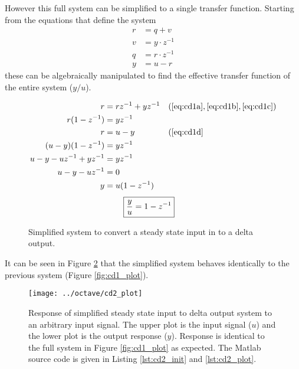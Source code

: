 \documentclass{article}
\begin{document}
\begin{samepage}
However this full system can be simplified to a single transfer function.
Starting from the equations that define the system
\begin{align}
	r &= q + v \label{eq:cd1a} \\
	v &= y \cdot z^{-1} \label{eq:cd1b} \\
	q &= r \cdot z^{-1} \label{eq:cd1c} \\
	y &= u - r \label{eq:cd1d}
\end{align}
these can be algebraically manipulated to find the effective transfer
function of the entire system ($y/u$).
\end{samepage}

\begin{align*}
	r &= r z^{-1} + y z^{-1} && (\ref{eq:cd1a}, \ref{eq:cd1b}, \ref{eq:cd1c})\\
	r(1 - z^{-1}) &= y z^{-1} \\
	r &= u - y && (\ref{eq:cd1d} \\
	(u - y)(1 - z^{-1}) &= y z^{-1} \\
	u - y - u z^{-1} + y z^{-1} &= y z^{-1} \\
	u - y - u z^{-1} &= 0 \\
	y &= u (1 - z^{-1})
\end{align*}
\begin{align}
	\Aboxed{ \frac{y}{u} &= 1 - z^{-1} }
\end{align}

\begin{figure}[!htbp]
\begin{center}


\end{center}
\caption{Simplified system to convert a steady state input in to
a delta output.}
\label{fig:cd1s}
\end{figure}

It can be seen in Figure \ref{fig:cd2_plot} that the simplified system
behaves identically to the previous system (Figure \ref{fig:cd1_plot}).

\begin{figure}[htbp!]
\texttt{[image: ../octave/cd2\_plot]}
\caption{Response of simplified steady state input to delta output system
to an arbitrary input signal.
The upper plot is the input signal ($u$) and the lower plot is
the output response ($y$).
Response is identical to the full system in Figure \ref{fig:cd1_plot}
as expected.
The Matlab source code is given in Listing \ref{lst:cd2_init}
and \ref{lst:cd2_plot}.
}
\label{fig:cd2_plot}
\end{figure}
\end{document}
